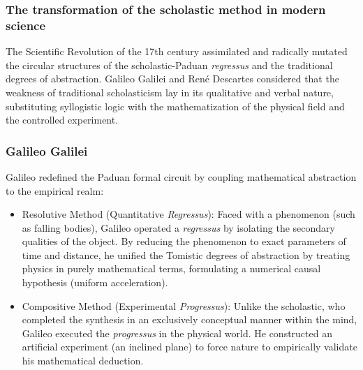 \documentclass[11pt, a4paper]{article}
\begin{document}

\subsubsection*{The transformation of the scholastic method in modern science}

The Scientific Revolution of the 17th century assimilated and radically mutated the circular structures of the scholastic-Paduan \textit{regressus} and the traditional degrees of abstraction. \textrm{Galileo Galilei} and \textrm{René Descartes} considered that the weakness of traditional scholasticism lay in its qualitative and verbal nature, substituting syllogistic logic with \textrm{the mathematization of the physical field and the controlled experiment}.

\subsubsection*{Galileo Galilei}
Galileo redefined the Paduan formal circuit by coupling mathematical abstraction to the empirical realm:
\begin{itemize}
	\item \textrm{Resolutive Method (Quantitative \textit{Regressus}):} Faced with a phenomenon (such as falling bodies), Galileo operated a \textit{regressus} by isolating the secondary qualities of the object. By reducing the phenomenon to exact parameters of time and distance, he unified the Tomistic degrees of abstraction by treating physics in purely mathematical terms, formulating a numerical causal hypothesis (uniform acceleration).
	\item \textrm{Compositive Method (Experimental \textit{Progressus}):} Unlike the scholastic, who completed the synthesis in an exclusively conceptual manner within the mind, Galileo executed the \textit{progressus} in the physical world. \textrm{He constructed an artificial experiment} (an inclined plane) to force nature to empirically validate his mathematical deduction.
\end{itemize}
\end{document}
